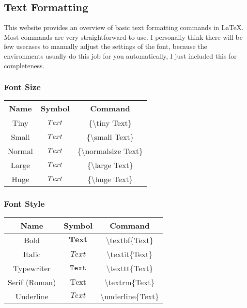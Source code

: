   \subsection{Text Formatting}
    This website provides an overview of basic text
    formatting commands in LaTeX. Most commands are 
    very straightforward to use. I personally think
    there will be few usecases to manually adjust 
    the settings of the font, because the environments 
    usually do this job for you automatically, 
    I just included this for completeness.
  \subsubsection{Font Size}
  \begin{center}
  \begin{tabular}{ccc}
  \toprule  %
  Name&	Symbol&	Command\\
  \midrule  %
    Tiny & $ {\tiny Text} $ & \{\textbackslash tiny Text\} \\
    Small & $ {\small Text} $ & \{\textbackslash small Text\} \\
    Normal & $ {\normalsize Text} $ & \{\textbackslash normalsize Text\} \\
    Large & $ {\large Text} $ & \{\textbackslash large Text\} \\
    Huge & $ {\huge Text} $ & \{\textbackslash huge Text\} \\
  \bottomrule %
  \end{tabular}
  \end{center}
  \subsubsection{Font Style}
  \begin{center}
  \begin{tabular}{ccc}
  \toprule  %
  Name&	Symbol&	Command\\
  \midrule  %
    Bold & $ \textbf{Text} $ & \textbackslash textbf\{Text\} \\
    Italic & $ \textit{Text} $ & \textbackslash textit\{Text\} \\
    Typewriter & $ \texttt{Text} $ & \textbackslash texttt\{Text\} \\
    Serif (Roman) & $ \textrm{Text} $ & \textbackslash textrm\{Text\} \\
    Underline & $ \underline{Text} $ & \textbackslash underline\{Text\} \\
  \bottomrule %
  \end{tabular}
  \end{center}

